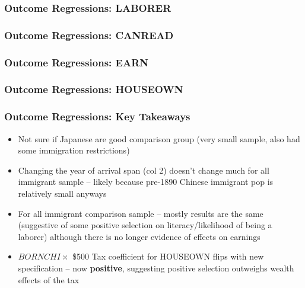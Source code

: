 \documentclass[pdf]{beamer}
\begin{document}
\begin{frame}[label = tab3_new_labor]
	\frametitle{Outcome Regressions: LABORER}
    \centering
    \begin{table}[H]
		\resizebox{\textwidth}{!}{
            
		}
	\end{table}  
\end{frame}

\begin{frame}[label = tab3_new_canread]
	\frametitle{Outcome Regressions: CANREAD}
    \centering
    \begin{table}[H]
		\resizebox{\textwidth}{!}{
            
		}
	\end{table}  
\end{frame}

\begin{frame}[label = tab3_new_earn]
	\frametitle{Outcome Regressions: EARN}
    \centering
    \begin{table}[H]
		\resizebox{\textwidth}{!}{
            
		}
	\end{table}  
\end{frame}

\begin{frame}[label = tab3_new_houseown]
	\frametitle{Outcome Regressions: HOUSEOWN}
    \centering
    \begin{table}[H]
		\resizebox{\textwidth}{!}{
            
		}
	\end{table}  
\end{frame}

\begin{frame}
    \frametitle{Outcome Regressions: Key Takeaways}
    \centering
    \begin{itemize}
        \item Not sure if Japanese are good comparison group (very small sample, also had some immigration restrictions)
        \item Changing the year of arrival span (col 2) doesn't change much for all immigrant sample -- likely because pre-1890 Chinese immigrant pop is relatively small anyways
        \item For all immigrant comparison sample -- mostly results are the same (suggestive of some positive selection on literacy/likelihood of being a laborer) although there is no longer evidence of effects on earnings 
        \item $BORNCHI \times$ \$500 Tax coefficient for HOUSEOWN flips with new specification -- now \textbf{positive}, suggesting positive selection outweighs wealth effects of the tax 
    \end{itemize}
\end{frame}
\end{document}
